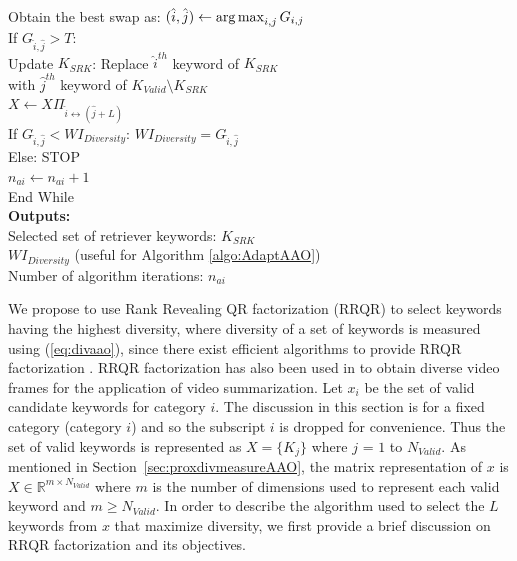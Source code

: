 \begin{algorithm}
\hspace*{6mm}        Obtain the best swap as: $(\hat{i}, \hat{j}) \leftarrow \operatorname*{arg\,max}_{i,j}{G_{i,j}}$ \\ 
\hspace*{6mm}        If $G_{\hat{i}, \hat{j}} > T$: \\ 
\hspace*{10mm}                           Update $K_{SRK}$: Replace $\hat{i}^{th}$ keyword of $K_{SRK}$ \\
\hspace*{10mm}                           with $\hat{j}^{th}$ keyword of $K_{Valid}  \setminus K_{SRK}$ \\ 
\hspace*{10mm}                           $X \leftarrow X \Pi_{ \hat{i} \leftrightarrow (\hat{j} + L) }$ \\ 
\hspace*{10mm}                           If $G_{ \hat{i}, \hat{j} }  < WI_{Diversity}$:  $WI_{Diversity} = G_{\hat{i}, \hat{j} }$ \\ 
\hspace*{6mm}               Else:  STOP \\ 
\hspace*{6mm}        $n_{ai} \leftarrow n_{ai} + 1 $ \\ 
\hspace*{2mm}   End While \\ 
\textbf{Outputs: }  \\ 
\hspace*{2mm}   Selected set of retriever keywords: $K_{SRK}$ \\ 
\hspace*{2mm}   $WI_{Diversity}$ (useful for Algorithm \ref{algo:AdaptAAO}) \\
\hspace*{2mm}   Number of algorithm iterations: $n_{ai}$
\end{algorithm}
We propose to use Rank Revealing QR factorization (RRQR) \cite{GuEfficient96} to select keywords having the highest diversity, where diversity of a set of keywords is measured using (\ref{eq:divaao}), since there exist efficient algorithms to provide RRQR factorization \cite{GuEfficient96,GolubNumeri65}. RRQR factorization has also been used in \cite{ShroffManifold11} to obtain diverse video frames for the application of video summarization. Let $x_i$ be the set of valid candidate keywords for category $i$. The discussion in this section is for a fixed category (category $i$) and so the subscript $i$ is dropped for convenience. Thus the set of valid keywords is represented as $X = \{K_j\}$ where $j$ = $1$ to $N_{Valid}$. As mentioned in Section~\ref{sec:proxdivmeasureAAO}, the matrix representation of $x$ is $X \in \mathbb{R}^{m\times N_{Valid}}$ where $m$ is the number of dimensions used to represent each valid keyword  and $m \ge N_{Valid}$. In order to describe the algorithm used to select the $L$ keywords from $x$ that maximize diversity, we first provide a brief discussion on RRQR factorization \cite{GuEfficient96,GolubNumeri65} and its objectives. 

